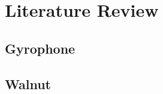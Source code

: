 \chapter{Literature Review}



\lipsum[1]

\newpage
\section{Gyrophone}
\lipsum[4]

\section{Walnut}
\lipsum[4]
